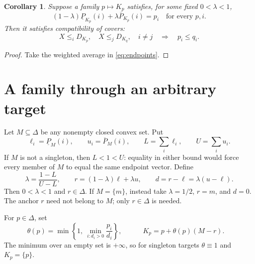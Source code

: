 \documentclass[11pt]{article}
\newtheorem{corollary}[theorem]{Corollary}
\theoremstyle{remark}
\newcommand{\lo}{\underline P}
\newcommand{\hi}{\overline P}
\begin{document}
\begin{corollary}\label{cor:cc}
Suppose a family $p\mapsto K_p$ satisfies, for some fixed $0<\lambda<1$,
\[
 (1-\lambda)\lo_{K_p}(i)+\lambda\hi_{K_p}(i)=p_i
 \quad\text{for every }p,i.
 \tag{2}\label{eq:index}
\]
Then it satisfies compatibility of covers:
\[
 X\le_iD_{K_p},\quad X\le_jD_{K_q},\quad i\ne j
 \quad\Longrightarrow\quad p_i\le q_i.
 \tag{CC}\label{eq:cc}
\]
\end{corollary}
\begin{proof}
Take the weighted average in \eqref{eq:endpoints}.
\end{proof}

\section{A family through an arbitrary target}

Let $M\subseteq\Delta$ be any nonempty closed convex set. Put
\[
 \ell_i=\lo_M(i),\qquad u_i=\hi_M(i),\qquad
 L=\sum_i\ell_i,\qquad U=\sum_i u_i.
\]
If $M$ is not a singleton, then $L<1<U$: equality in either bound would
force every member of $M$ to equal the same endpoint vector. Define
\[
 \lambda=\frac{1-L}{U-L},\qquad
 r=(1-\lambda)\ell+\lambda u,
 \qquad d=r-\ell=\lambda(u-\ell).
 \tag{3}\label{eq:anchor}
\]
Then $0<\lambda<1$ and $r\in\Delta$. If $M=\{m\}$, instead take
$\lambda=1/2$, $r=m$, and $d=0$. The anchor $r$ need not belong to $M$;
only $r\in\Delta$ is needed.

For $p\in\Delta$, set
\[
 \theta(p)=\min\left\{1,\ \min_{i:d_i>0}\frac{p_i}{d_i}\right\},
 \qquad
 \boxed{\quad K_p=p+\theta(p)(M-r).\quad}
 \tag{4}\label{eq:family}
\]
The minimum over an empty set is $+\infty$, so for singleton targets
$\theta\equiv1$ and $K_p=\{p\}$.
\end{document}

